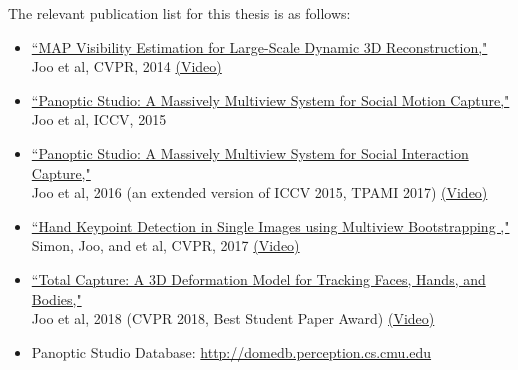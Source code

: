 The relevant publication list for this thesis is as follows: 
\begin{itemize}
	\item  \noindent \href{http://www.cs.cmu.edu/~hanbyulj/14/CVPR_2014_Visibility.pdf}{``MAP Visibility Estimation for Large-Scale Dynamic 3D Reconstruction,"}\\ 
	Joo et al, CVPR, 2014 \href{https://www.youtube.com/watch?v=LaHTjBWago8}{(Video)}
	
	\item \noindent \href{http://www.cs.cmu.edu/~hanbyulj/panoptic-studio/ICCV2015_SMC.pdf}{``Panoptic Studio: A Massively Multiview System for Social Motion Capture,"}\\ 
	Joo et al, ICCV, 2015 
	
	\item \noindent \href{https://ieeexplore.ieee.org/document/8187699}{``Panoptic Studio: A Massively Multiview System for Social Interaction Capture,"}\\ 
	Joo et al, 2016 (an extended version of ICCV 2015, TPAMI 2017) \href{https://www.youtube.com/watch?v=m0-7HnWvxG4}{(Video)}
	
	\item \noindent \href{https://arxiv.org/abs/1704.07809}{``Hand Keypoint Detection in Single Images using Multiview Bootstrapping ,"}\\ 
	Simon, Joo, and et al, CVPR, 2017 \href{https://www.youtube.com/watch?v=Lajt6vS_dSM}{(Video)}	
	
	\item \noindent \href{http://openaccess.thecvf.com/content_cvpr_2018/papers/Joo_Total_Capture_A_CVPR_2018_paper.pdf}{``Total Capture: A 3D Deformation Model for Tracking Faces, Hands, and Bodies,"}\\ 
	Joo et al, 2018 (CVPR 2018, Best Student Paper Award) \href{https://www.youtube.com/watch?v=5QzdXQSf-oY}{(Video)}	
	
	\item \noindent Panoptic Studio Database: \url{http://domedb.perception.cs.cmu.edu}
	
	
\end{itemize}

